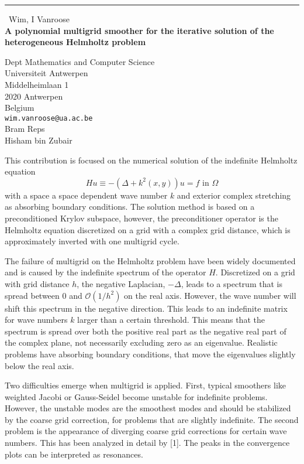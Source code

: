 \documentclass{report}
\begin{document}
\begin{center}
\rule{6in}{1pt} \
{\large Wim, I Vanroose \\
{\bf A polynomial multigrid smoother for the iterative solution of the heterogeneous Helmholtz problem}}

Dept Mathematics and Computer Science \\ Universiteit Antwerpen \\ Middelheimlaan 1 \\ 2020 Antwerpen \\ Belgium
\\
{\tt wim.vanroose@ua.ac.be}\\
Bram Reps\\
Hisham bin Zubair\end{center}

This contribution is focused on the numerical solution of the
indefinite Helmholtz equation
\begin{equation}\label{eq:helmholtz}
Hu \equiv -(\Delta+k^2(x,y))u= f \mbox{ in } \Omega
\end{equation}
with a space a space dependent wave number $k$ and exterior complex
stretching as absorbing boundary conditions. The solution method is
based on a preconditioned Krylov subspace, however, the preconditioner
operator is the Helmholtz equation discretized on a grid with a
complex grid distance, which is approximately inverted with one
multigrid cycle.

The failure of multigrid on the Helmholtz problem have been widely
documented and is caused by the indefinite spectrum of the operator
$H$. Discretized on a grid with grid distance $h$, the negative
Laplacian, $-\Delta$, leads to a spectrum that is spread between $0$ and
$\mathcal{O}(1/h^2)$ on the real axis. However, the wave number will
shift this spectrum in the negative direction. This leads to an
indefinite matrix for wave numbers $k$ larger than a certain
threshold. This means that the spectrum is spread over both the
positive real part as the negative real part of the complex plane, not
necessarily excluding zero as an eigenvalue. Realistic problems have
absorbing boundary conditions, that move the eigenvalues slightly below
the real axis.

Two difficulties emerge when multigrid is applied. First, typical
smoothers like weighted Jacobi or Gauss-Seidel become unstable for
indefinite problems. However, the unstable modes are the smoothest
modes and should be stabilized by the coarse grid correction, for
problems that are slightly indefinite. The second problem is the
appearance of diverging coarse grid corrections for certain wave
numbers. This has been analyzed in detail by [1]. The peaks
in the convergence plots can be interpreted as resonances.
\end{document}
